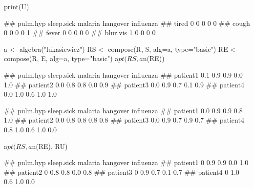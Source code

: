 \documentclass{article}\usepackage[]{graphicx}\usepackage[]{color}
\begin{document}
\begin{Schunk}
% --begin: "comp.u"
\begin{Sinput}
print(U)
\end{Sinput}
\begin{Soutput}
##          pulm.hyp sleep.sick malaria hangover influenza
## tired           0          0       0        0         0
## cough           0          0       0        0         1
## fever           0          0       0        0         0
## blur.vis        1          0       0        0         0
\end{Soutput}
%
% --end: "comp.u"
\end{Schunk}

\begin{Schunk}
% --begin: "comp.circ.excl"
\begin{Sinput}
a <- algebra("lukasiewicz")
RS <- compose(R, S, alg=a, type="basic")
RE <- compose(R, E, alg=a, type="basic")
a$pt(RS, a$n(RE))
\end{Sinput}
\begin{Soutput}
##          pulm.hyp sleep.sick malaria hangover influenza
## patient1      0.1        0.9     0.9      0.0       1.0
## patient2      0.0        0.8     0.8      0.0       0.9
## patient3      0.0        0.9     0.7      0.1       0.9
## patient4      0.0        1.0     0.6      1.0       1.0
\end{Soutput}
%
% --end: "comp.circ.excl"
\end{Schunk}

\begin{Schunk}
% --begin: "comp.circ.unavoid"
\begin{Soutput}
##          pulm.hyp sleep.sick malaria hangover influenza
## patient1      0.0        0.9     0.9      0.8       1.0
## patient2      0.0        0.8     0.8      0.8       0.8
## patient3      0.0        0.9     0.7      0.9       0.7
## patient4      0.8        1.0     0.6      1.0       0.0
\end{Soutput}
%
% --end: "comp.circ.unavoid"
\end{Schunk}

\begin{Schunk}
% --begin: "comp.circ.excl.unavoid"
\begin{Sinput}
a$pt(RS, a$n(RE), RU)
\end{Sinput}
\begin{Soutput}
##          pulm.hyp sleep.sick malaria hangover influenza
## patient1        0        0.9     0.9      0.0       1.0
## patient2        0        0.8     0.8      0.0       0.8
## patient3        0        0.9     0.7      0.1       0.7
## patient4        0        1.0     0.6      1.0       0.0
\end{Soutput}
%
% --end: "comp.circ.excl.unavoid"
\end{Schunk}
\end{document}
